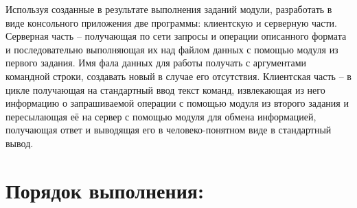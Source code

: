 \documentclass[12pt,onecolumn]{article}
\begin{document}
Используя созданные в результате выполнения заданий модули, разработать в виде консольного приложения две программы: клиентскую и серверную части. Серверная часть – получающая по сети запросы и операции описанного формата и последовательно выполняющая их над файлом данных с помощью модуля из первого задания. Имя фала данных для работы получать с аргументами командной строки, создавать новый в случае
его отсутствия. Клиентская часть – в цикле получающая на стандартный ввод текст команд, извлекающая из него информацию о запрашиваемой операции с помощью модуля из второго задания и пересылающая её на сервер с помощью модуля для обмена информацией, получающая ответ и выводящая его в человеко-понятном виде в стандартный вывод.

\section{Порядок выполнения:}
\end{document}
